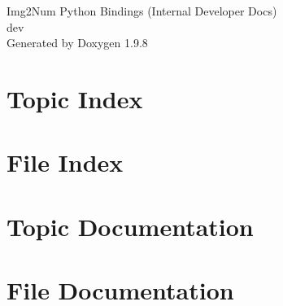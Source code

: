\documentclass[twoside]{book}
\newcommand{\+}{\discretionary{\mbox{\scriptsize$\hookleftarrow$}}{}{}}
\newcommand{\clearemptydoublepage}{%
    \newpage{\pagestyle{empty}\cleardoublepage}%
  }
\begin{document}
  \raggedbottom
    \hypersetup{pageanchor=false,
                bookmarksnumbered=true,
                pdfencoding=unicode
               }
  \begin{titlepage}
  \vspace*{7cm}
  \begin{center}%
  {\Large Img2\+Num Python Bindings (\+Internal Developer Docs)}\\
  [1ex]\large dev \\
  \vspace*{1cm}
  {\large Generated by Doxygen 1.9.8}\\
  \end{center}
  \end{titlepage}
  \clearemptydoublepage
  \tableofcontents
  \clearemptydoublepage
  \hypersetup{pageanchor=true}

\chapter{Topic Index}

\chapter{File Index}

\chapter{Topic Documentation}

\chapter{File Documentation}

  \backmatter
  \newpage
  \clearemptydoublepage
  \printindex
\end{document}

